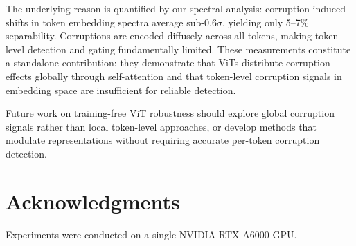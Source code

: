\documentclass{article}
\begin{document}
The underlying reason is quantified by our spectral analysis: corruption-induced shifts in token embedding spectra average sub-$0.6\sigma$, yielding only 5--7\% separability. Corruptions are encoded diffusely across all tokens, making token-level detection and gating fundamentally limited. These measurements constitute a standalone contribution: they demonstrate that ViTs distribute corruption effects globally through self-attention and that token-level corruption signals in embedding space are insufficient for reliable detection.

Future work on training-free ViT robustness should explore global corruption signals rather than local token-level approaches, or develop methods that modulate representations without requiring accurate per-token corruption detection.

\section*{Acknowledgments}
Experiments were conducted on a single NVIDIA RTX A6000 GPU.
\end{document}
